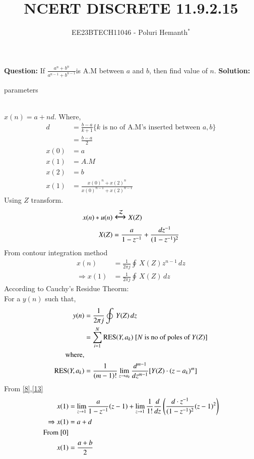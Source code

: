 \documentclass[journal,12pt,twocolumn]{IEEEtran}
\theoremstyle{remark}
\begin{document}

\vspace{3cm}


\title{NCERT DISCRETE 11.9.2.15}
\author{EE23BTECH11046 - Poluri Hemanth$^{*}$}
\maketitle
\textbf{Question:}
If \( \frac{a^n +b^n}{a^{n-1} + b^{n-1}}\)is A.M between $a$ and $b$, then find value of $n$.
\break
\textbf{Solution:}
\begin{table}[h!]
        
        \caption{parameters}
\end{table}
\\
$x(n)=a+nd$. Where,
\begin{align}
	 d&=\frac{b-a}{k+1}\{k\text{ is no of A.M's inserted between }a ,b\}\\
	 &=\frac{b-a}{2}\label{0}\\
	x(0)&=a\label{a}\\
	x(1)&=A.M\\
	x(2)&=b\label{b}\\
	x(1)&=\frac{x(0)^n +x(2)^n}{x(0)^{n-1} + x(2)^{n-1}}\label{r} 
\end{align}
Using $Z$ transform.
\begin{align}
	x(n)*u(n)&\Large\xleftrightarrow{\mathcal{Z}}X(Z)\\
	X(Z)&=\frac{a}{1-z^{-1}}+\frac{dz^{-1}}{(1-z^{-1})^2}\label{8}\\
\end{align}
From contour integration method
\begin{align}
	x(n)&=\frac{1}{2\pi j}\oint\,X(Z)z^{n-1}\,dz\\
	\Rightarrow x(1)&=\frac{1}{2\pi j}\oint\,X(Z)\,dz
\end{align}
According to Cauchy's Residue Theorm:\\
For a $y(n)$ such that, \\
\begin{align}
	y(n)&=\frac{1}{2\pi j}\oint\,Y(Z)\,dz\\
	&=\sum\limits_{i=1}^N\text{RES}(Y,a_k) \text{  [$N$ is no of poles of $Y(Z)$]}\label{13}\\
	\notag\text{where,}\\
	\text{RES}(Y,a_k)&=\frac{1}{(m-1)!}\lim_{z\to a_k}\frac{d^{m-1}}{dz^{m-1}}[Y(Z)\cdot(z-a_k)^{m}]
\end{align}
From \eqref{8},\eqref{13}
\begin{align}	
	x(1)&=\lim_{z\to1}\frac{a}{1-z^{-1}}(z-1)+\lim_{z\to1}\frac{1}{1!}\frac{d}{dz}\left(\frac{d\cdot z^{-1}}{(1-z^{-1})^2}(z-1)^2\right)\\
	\Rightarrow x(1)&=a+d\\
	\notag\text{From \eqref{0}}\\
	 x(1)&=\frac{a+b}{2}\label{1}
\end{align}
\end{document}

